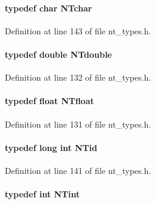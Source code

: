 \paragraph[{NTchar}]{\setlength{\rightskip}{0pt plus 5cm}typedef char {\bf NTchar}}\hfill\label{nt__types_8h_a2f8aef15108d185e7c6f2642895b6a41}


Definition at line 143 of file nt\_\-types.h.

\paragraph[{NTdouble}]{\setlength{\rightskip}{0pt plus 5cm}typedef double {\bf NTdouble}}\hfill\label{nt__types_8h_a83a0562e7df446bc32e2d8de1675e721}


Definition at line 132 of file nt\_\-types.h.

\paragraph[{NTfloat}]{\setlength{\rightskip}{0pt plus 5cm}typedef float {\bf NTfloat}}\hfill\label{nt__types_8h_afe18c05634a674e4c36a51d9839be77b}


Definition at line 131 of file nt\_\-types.h.

\paragraph[{NTid}]{\setlength{\rightskip}{0pt plus 5cm}typedef long int {\bf NTid}}\hfill\label{nt__types_8h_ab5cab5f78fdd2211c340cbe527a4afd7}


Definition at line 141 of file nt\_\-types.h.

\paragraph[{NTint}]{\setlength{\rightskip}{0pt plus 5cm}typedef int {\bf NTint}}\hfill\label{nt__types_8h_aee8aa0a9869e8b5c97c6c02217ff09cd}


